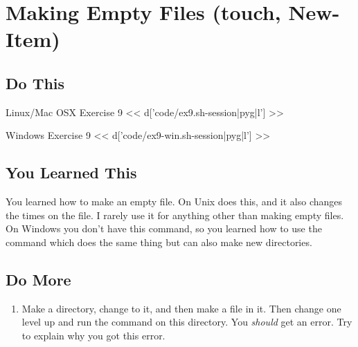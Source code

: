 \chapter{Making Empty Files (touch, New-Item)}

\section{Do This}

\begin{code}{Linux/Mac OSX Exercise 9}
<< d['code/ex9.sh-session|pyg|l'] >>
\end{code}

\begin{code}{Windows Exercise 9}
<< d['code/ex9-win.sh-session|pyg|l'] >>
\end{code}

\section{You Learned This}

You learned how to make an empty file.  On Unix  does this, and
it also changes the times on the file.  I rarely use it for anything other than
making empty files.  On Windows you don't have this command, so you learned
how to use the  command which does the same thing but can
also make new directories.

\section{Do More}

\begin{enumerate}
\item Make a directory, change to it, and then make a file in it.  Then change
    one level up and run the  command on this directory.  You
    \emph{should} get an error.  Try to explain why you got this error.
\end{enumerate}

